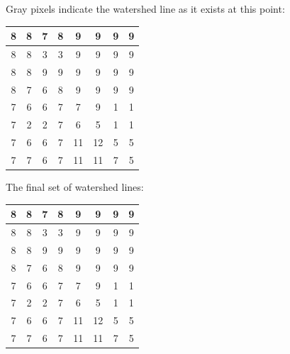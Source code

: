 \documentclass[fleqn]{article}
\begin{document}
\begin{description}
    Gray pixels indicate the watershed line as it exists at this point:

    \begin{tabular}{| c | c | c | c | c | c | c | c |}
        \hline
        8 & 8 & \cellcolor{red}7 & 8 & 9 & 9 & 9 & 9 \\ \hline
        8 & 8 & \cellcolor{red} 3 & \cellcolor{red} 3 & 9 & 9 & 9 & 9 \\ \hline
        8 & 8 & 9 & 9 & 9 & 9 & 9 & 9 \\ \hline
        8 & \cellcolor{blue}7 & \cellcolor{blue} 6 & 8 & 9 & 9 & 9 & 9 \\ \hline
        \cellcolor{blue}7 & \cellcolor{blue} 6 & \cellcolor{blue} 6 & \cellcolor{lightgray} 7 & \cellcolor{green} 7 & 9 & \cellcolor{green} 1 & \cellcolor{green} 1 \\ \hline
        \cellcolor{blue}7 & \cellcolor{blue} 2 & \cellcolor{blue} 2 & \cellcolor{lightgray} 7 & \cellcolor{green} 6 & \cellcolor{green} 5 & \cellcolor{green} 1 & \cellcolor{green} 1 \\ \hline
        \cellcolor{blue}7 & \cellcolor{blue} 6 & \cellcolor{blue} 6 & \cellcolor{lightgray} 7 & 11 & 12 & \cellcolor{green} 5 & \cellcolor{green} 5 \\ \hline
        \cellcolor{blue}7 & \cellcolor{blue}7 & \cellcolor{blue} 6 & \cellcolor{blue}7 & 11 & 11 & \cellcolor{green} 7 & \cellcolor{green} 5 \\
        \hline
    \end{tabular}

    The final set of watershed lines:

    \begin{tabular}{| c | c | c | c | c | c | c | c |}
        \hline
        8 & 8 & 7 & 8 & 9 & 9 & 9 & 9 \\ \hline
        8 & 8 & 3 & 3 & 9 & 9 & 9 & 9 \\ \hline
        \cellcolor{lightgray} 8 & \cellcolor{lightgray} 8 & \cellcolor{lightgray} 9 & \cellcolor{lightgray} 9 & 9 & 9 & 9 & 9 \\ \hline
        \cellcolor{lightgray} 8 & 7 & 6 & \cellcolor{lightgray} 8 & \cellcolor{lightgray} 9 & \cellcolor{lightgray} 9 & \cellcolor{lightgray} 9 & \cellcolor{lightgray} 9 \\ \hline
        7 & 6 & 6 & \cellcolor{lightgray} 7 & 7 & 9 & 1 & 1 \\ \hline
        7 & 2 & 2 & \cellcolor{lightgray} 7 & 6 & 5 & 1 & 1 \\ \hline
        7 & 6 & 6 & \cellcolor{lightgray} 7 & \cellcolor{lightgray} 11 & 12 & 5 & 5 \\ \hline
        7 & 7 & 6 & 7 & \cellcolor{lightgray} 11 & 11 & 7 & 5 \\
        \hline
    \end{tabular}


\end{description}
\end{document}
